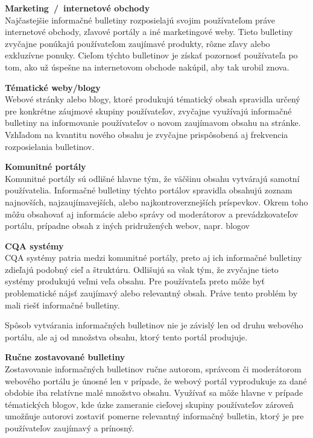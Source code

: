 \begin{my_itemize}
  \item{\textbf{Marketing~/~internetové obchody}\\
        Najčastejšie informačné bulletiny rozposielajú svojim používateľom
        práve internetové obchody, zľavové portály a iné marketingové weby. Tieto bulletiny zvyčajne ponúkajú používateľom
        zaujímavé produkty, rôzne zľavy alebo exkluzívne ponuky. Cieľom týchto bulletinov je získať pozornosť používateľa
        po tom, ako už úspešne na internetovom obchode nakúpil, aby tak urobil znova.}
  \item{\textbf{Tématické weby/blogy}\\
        Webové stránky alebo blogy, ktoré produkujú tématický obsah spravidla určený pre konkrétne záujmové skupiny používateľov,
        zvyčajne využívajú informačné bulletiny na informovanie používateľov o novom zaujímavom obsahu na stránke.
        Vzhľadom na kvantitu nového obsahu je zvyčajne prispôsobená aj frekvencia rozposielania bulletinov.}
  \item{\textbf{Komunitné portály}\\
        Komunitné portály sú odlišné hlavne tým, že väčšinu obsahu vytvárajú samotní používatelia. Informačné
        bulletiny týchto portálov spravidla obsahujú zoznam najnovších, najzaujímavejších, alebo najkontroverznejších
        príspevkov. Okrem toho môžu obsahovať aj informácie alebo správy od moderátorov a prevádzkovateľov portálu, prípadne
        obsah z iných pridružených webov, napr. blogov}
  \item{\textbf{CQA systémy}\\
        CQA systémy patria medzi komunitné portály, preto aj ich informačné bulletiny zdieľajú podobný cieľ a štruktúru.
        Odlišujú sa však tým, že zvyčajne tieto systémy produkujú veľmi veľa obsahu. Pre používateľa preto môže byť
        problematické nájsť zaujímavý alebo relevantný obsah. Práve tento problém by mali riešť informačné bulletiny.}
\end{my_itemize}


Spôsob vytvárania informačných bulletinov nie je závislý len od druhu webového portálu, ale aj od množstva obsahu, ktorý
tento portál produjuje.

\textbf{Ručne zostavované bulletiny}\\
Zostavovanie informačných bulletinov ručne autorom, správcom či moderátorom webového portálu je únosné len v prípade, že
webový portál vyprodukuje za dané obdobie iba relatívne malé množstvo obsahu. Využívať sa môže hlavne v prípade tématických
blogov, kde úzke zameranie cieľovej skupiny používateľov zároveň umožňuje autorovi zostaviť pomerne relevantný informačný
bulletin, ktorý je pre používateľov zaujímavý a prínosný.

